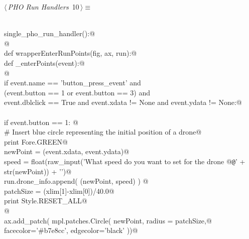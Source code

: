 \documentclass[12.0pt]{report}
\begin{document}
\begin{flushleft} \small\label{scrap6}\raggedright\small
{} $\langle\,${\itshape PHO Run Handlers}\nobreak\ {\footnotesize {10}}$\,\rangle\equiv$
\vspace{-1ex}
\begin{list}{}{} \item
\mbox{}\verb@@\\
\mbox{}\verb@def single_pho_run_handler():@\\
\mbox{}\verb@ @\\
\mbox{}\verb@    def wrapperEnterRunPoints(fig, ax, run):@\\
\mbox{}\verb@      def _enterPoints(event):@\\
\mbox{}\verb@        @\\
\mbox{}\verb@        if event.name      == 'button_press_event'          and \@\\
\mbox{}\verb@           (event.button   == 1 or event.button == 3)       and \@\\
\mbox{}\verb@            event.dblclick == True and event.xdata  != None and event.ydata  != None:@\\
\mbox{}\verb@@\\
\mbox{}\verb@             if event.button == 1:  @\\
\mbox{}\verb@                 # Insert blue circle representing the initial position of a drone@\\
\mbox{}\verb@                 print Fore.GREEN@\\
\mbox{}\verb@                 newPoint = (event.xdata, event.ydata)@\\
\mbox{}\verb@                 speed    = float(raw_input('What speed do you want to set for the drone @{\tt @}\verb@ ' + str(newPoint)) + '\n')@\\
\mbox{}\verb@                 run.drone_info.append( (newPoint, speed) ) @\\
\mbox{}\verb@                 patchSize  = (xlim[1]-xlim[0])/40.0@\\
\mbox{}\verb@                 print Style.RESET_ALL@\\
\mbox{}\verb@                 @\\
\mbox{}\verb@                 ax.add_patch( mpl.patches.Circle( newPoint, radius = patchSize,@\\
\mbox{}\verb@                                                   facecolor='#b7e8cc', edgecolor='black'  ))@\\
\mbox{}\verb@@\\

\end{list}
\end{flushleft}
\end{document}
